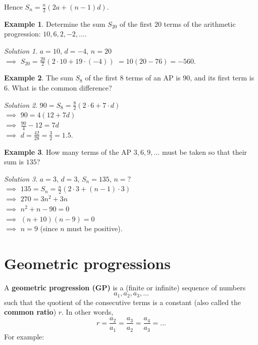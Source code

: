 \documentclass[
  12pt,
  oneside]{book}
\theoremstyle{definition}
\theoremstyle{definition}
\newtheorem{example}{Example}[chapter]
\theoremstyle{definition}
\theoremstyle{definition}
\theoremstyle{remark}
\newtheorem*{solution}{Solution}
\begin{document}
Hence \(S_n = \frac{n}{2}(2a+(n-1)d)\).

\begin{example}
Determine the sum \(S_{20}\) of the first \(20\) terms of the arithmetic progression: \(10, 6, 2, -2, \dots\).
\end{example}

\begin{solution}
\(a=10\), \(d=-4\), \(n=20\)\\
\(\implies\) \(S_{20}=\frac{20}{2}(2\cdot 10+ 19\cdot(-4))\) \(=10(20-76)=-560\).
\end{solution}

\begin{example}
The sum \(S_8\) of the first \(8\) terms of an AP is \(90\), and its first term is \(6\). What is the common difference?
\end{example}

\begin{solution}
\(90=S_8=\frac{8}{2}(2\cdot 6 + 7\cdot d)\)\\
\(\implies\) \(90=4(12+7d)\)\\
\(\implies\) \(\frac{90}{4}-12=7d\)\\
\(\implies\) \(d=\frac{42}{28}=\frac32=1.5\).
\end{solution}

\begin{example}
How many terms of the AP \(3,6,9,\dots\) must be taken so that their sum is \(135\)?
\end{example}

\begin{solution}
\(a=3\), \(d=3\), \(S_n=135\), \(n=?\)\\
\(\implies\) \(135 = S_n = \frac{n}{2}(2\cdot 3+(n-1)\cdot 3)\)\\
\(\implies\) \(270 = 3n^2 + 3n\)\\
\(\implies\) \(n^2+n-90 = 0\)\\
\(\implies\) \((n+10)(n-9)=0\)\\
\(\implies\) \(n=9\) (since \(n\) must be positive).
\end{solution}

\hypertarget{geometric-progressions}{%
\section{Geometric progressions}\label{geometric-progressions}}

A \textbf{geometric progression (GP)} is a (finite or infinite) sequence of numbers
\[
a_1,a_2,a_3,\dots
\]
such that the quotient of the consecutive terms is a constant (also called the \textbf{common ratio}) \(r\). In other words,
\[
r = \frac{a_2}{a_1} = \frac{a_3}{a_2} = \frac{a_4}{a_3} = \dots
\]
For example:
\end{document}
